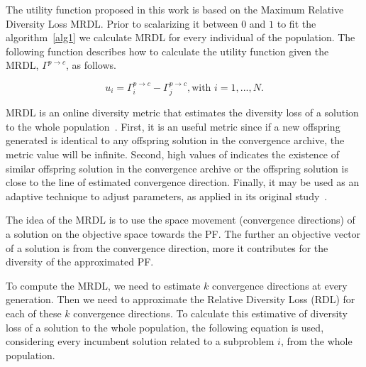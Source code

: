
The utility function proposed in this work is based on the Maximum Relative Diversity Loss MRDL. Prior to scalarizing it between $0$ and $1$ to fit the algorithm~\ref{alg1} we calculate MRDL for every individual of the population. The following function describes how to calculate the utility function given the MRDL, $\Gamma^{p \rightarrow c}$, as follows.

\begin{equation}
u_i = \Gamma^{p \rightarrow c}_i -  \Gamma^{p \rightarrow c}_j, \text{with  $i=1,...,N$.}
\end{equation}


MRDL is an online diversity metric that estimates the diversity loss of a solution to the whole population~\cite{gee2015online}. First, it is an useful metric since if a new offspring generated is identical to any offspring solution in the convergence archive, the metric value will be infinite. Second, high values of  indicates the existence of similar offspring solution in the convergence archive or the offspring solution is close to the line of estimated convergence direction. Finally, it may be used as an adaptive technique to adjust parameters, as applied in its original study~\cite{gee2015online}.

The idea of the MRDL is to use the space movement (convergence directions) of a solution on the objective space towards the PF. The further an objective vector of a solution is from the convergence direction, more it contributes for the diversity of the approximated PF.


To compute the MRDL, we need to estimate $k$ convergence directions at every generation. Then we need to  approximate the Relative Diversity Loss (RDL) for each of these $k$ convergence directions. To calculate this estimative of diversity loss of a solution to the whole population, the following equation is used, considering every incumbent solution related to a subproblem $i$, from the whole population.
 

